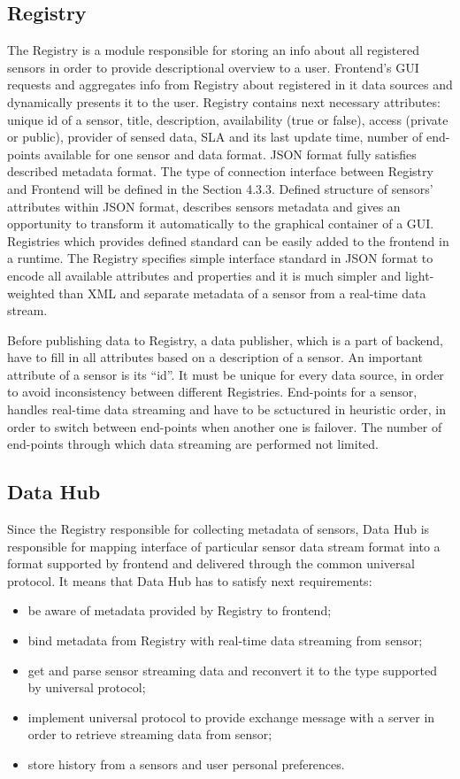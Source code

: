   \subsection{Registry}
    The Registry is a module responsible for storing an info about all registered sensors in order to provide descriptional overview to a user. Frontend's GUI requests and aggregates info from Registry about registered in it data sources and dynamically presents it to the user. Registry contains next necessary attributes: unique id of a sensor, title, description, availability (true or false), access (private or public), provider of sensed data, SLA and its last update time, number of end-points available for one sensor and data format. JSON format fully satisfies described metadata format. The type of connection interface between Registry and Frontend will be defined in the Section 4.3.3. Defined structure of sensors' attributes within JSON format, describes sensors metadata and gives an opportunity to transform it automatically to the graphical container of a GUI. Registries which provides defined standard can be easily added to the frontend in a runtime. The Registry specifies simple interface standard in JSON format to encode all available attributes and properties and it is much simpler and light-weighted than XML and separate metadata of a sensor from a real-time data stream. 

    Before publishing data to Registry, a data publisher, which is a part of backend, have to fill in all attributes based on a description of a sensor. An important attribute of a sensor is its ``id''. It must be unique for every data source, in order to avoid inconsistency between different Registries. End-points for a sensor, handles real-time data streaming and have to be sctuctured in heuristic order, in order to switch between end-points when another one is failover. The number of end-points through which data streaming are performed not limited.

  \subsection{Data Hub}
    Since the Registry responsible for collecting metadata of sensors, Data Hub is responsible for mapping interface of particular sensor data stream format into a format supported by frontend and delivered through the common universal protocol. It means that Data Hub has to satisfy next requirements:

    \begin{itemize}
    \item be aware of metadata provided by Registry to frontend;
    \item bind metadata from Registry with real-time data streaming from sensor;
    \item get and parse sensor streaming data and reconvert it to the type supported by universal protocol;
    \item implement universal protocol to provide exchange message with a server in order to retrieve streaming data from sensor;
    \item store history from a sensors and user personal preferences.
    \end{itemize}
    
